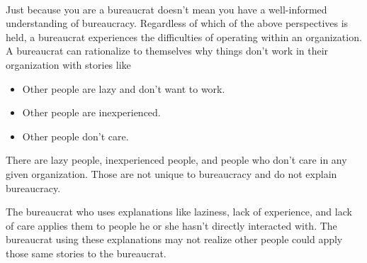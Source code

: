 \ \\

Just because you are a bureaucrat doesn't mean you have a well-informed understanding of bureaucracy. Regardless of which of the above perspectives is held, a bureaucrat experiences the difficulties of operating within an organization. A bureaucrat can rationalize to themselves why things don't work in their organization with stories like
\begin{itemize}
\item Other people are lazy and don't want to work.
\item Other people are inexperienced.
\item Other people don't care.
\end{itemize}
There are lazy people, inexperienced people, and people who don't care in any given organization. Those are not unique to bureaucracy and do not explain bureaucracy.

The bureaucrat who uses explanations like laziness, lack of experience, and lack of care applies them to people he or she hasn't directly interacted with.  The bureaucrat using these explanations may not realize other people could apply those same stories to the bureaucrat. 
